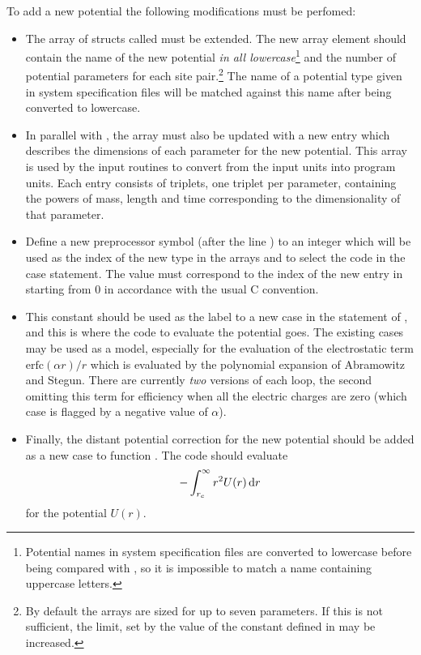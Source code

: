 \documentclass[a4paper,twoside]{report}
\newcommand{\erfc}{\mbox{erfc}}
\begin{document}
To add a new potential the following modifications must be perfomed:
\begin{itemize}
\item The array of structs called  must be extended.
  The new array element should contain the name of the new potential
  \emph{in all lowercase}\footnote{Potential names in system
    specification files are converted to lowercase before being
    compared with , so it is impossible to match a name
    containing uppercase letters.}  and the number of potential
  parameters for each site pair.\footnote{By default the arrays are
    sized for up to seven parameters. If this is not sufficient, the
    limit, set by the value of the constant  defined in
     may be increased.}  The name of a potential type
  given in system specification files will be matched against this
  name after being converted to lowercase.
\item In parallel with , the array 
  must also be updated with a new entry which describes the dimensions
  of each parameter for the new potential. This array is used by the
  input routines to convert from the input units into program units.
  Each entry consists of triplets, one triplet per parameter,
  containing the powers of mass, length and time corresponding to the
  dimensionality of that parameter.
\item Define a new preprocessor symbol (after the line
  ) to an integer which will be used as the
  index of the new type in the arrays and to select the code in the
  case statement.  The value must correspond to the index of the new
  entry in  starting from 0 in accordance with the
  usual C convention.  
  
\item This constant should be used as the label to a new case in the
   statement of , and this is where the code
  to evaluate the potential goes.  The existing cases may be used as a
  model, especially for the evaluation of the electrostatic term
  $\erfc(\alpha r) / r$ which is evaluated by the polynomial expansion
  of Abramowitz and Stegun\cite[section 7.1.26]{abramowitz:70}. There
  are currently \emph{two} versions of each loop, the second omitting
  this term for efficiency when all the electric charges are zero
  (which case is flagged by a negative value of $\alpha$).

\item Finally, the distant potential correction for the new potential
  should be added as a new case to function . The
  code should evaluate
\[
- \int^{\infty}_{r_c} r^2 U(r) \, \mathrm{d} r
\]
for the potential $U(r)$.
\end{itemize}
\end{document}

